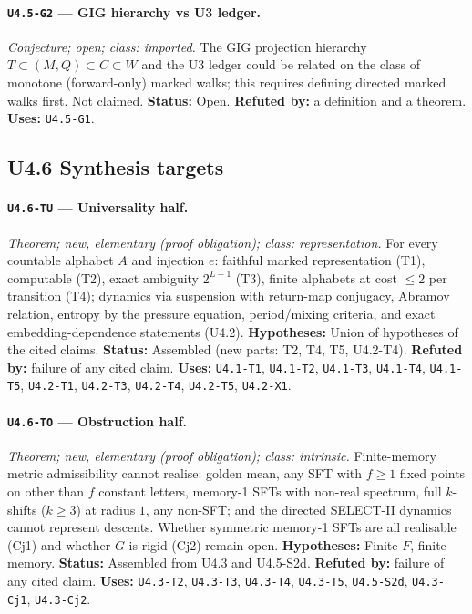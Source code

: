 \documentclass[11pt]{article}
\begin{document}
\paragraph{\texttt{U4.5-G2} --- GIG hierarchy vs U3 ledger.} \emph{Conjecture; open; class: imported.} The GIG projection hierarchy $T\subset(M,Q)\subset C\subset W$ and the U3 ledger could be related on the class of monotone (forward-only) marked walks; this requires defining directed marked walks first. Not claimed. \textbf{Status:} Open. \textbf{Refuted by:} a definition and a theorem. \textbf{Uses:} \texttt{U4.5-G1}.

\subsection{U4.6 Synthesis targets}
\paragraph{\texttt{U4.6-TU} --- Universality half.} \emph{Theorem; new, elementary (proof obligation); class: representation.} For every countable alphabet $A$ and injection $e$: faithful marked representation (T1), computable (T2), exact ambiguity $2^{L-1}$ (T3), finite alphabets at cost $\le2$ per transition (T4); dynamics via suspension with return-map conjugacy, Abramov relation, entropy by the pressure equation, period/mixing criteria, and exact embedding-dependence statements (U4.2). \textbf{Hypotheses:} Union of hypotheses of the cited claims. \textbf{Status:} Assembled (new parts: T2, T4, T5, U4.2-T4). \textbf{Refuted by:} failure of any cited claim. \textbf{Uses:} \texttt{U4.1-T1}, \texttt{U4.1-T2}, \texttt{U4.1-T3}, \texttt{U4.1-T4}, \texttt{U4.1-T5}, \texttt{U4.2-T1}, \texttt{U4.2-T3}, \texttt{U4.2-T4}, \texttt{U4.2-T5}, \texttt{U4.2-X1}.

\paragraph{\texttt{U4.6-TO} --- Obstruction half.} \emph{Theorem; new, elementary (proof obligation); class: intrinsic.} Finite-memory metric admissibility cannot realise: golden mean, any SFT with $f\ge1$ fixed points on other than $f$ constant letters, memory-1 SFTs with non-real spectrum, full $k$-shifts ($k\ge3$) at radius $1$, any non-SFT; and the directed SELECT-II dynamics cannot represent descents. Whether symmetric memory-1 SFTs are all realisable (Cj1) and whether $G$ is rigid (Cj2) remain open. \textbf{Hypotheses:} Finite $F$, finite memory. \textbf{Status:} Assembled from U4.3 and U4.5-S2d. \textbf{Refuted by:} failure of any cited claim. \textbf{Uses:} \texttt{U4.3-T2}, \texttt{U4.3-T3}, \texttt{U4.3-T4}, \texttt{U4.3-T5}, \texttt{U4.5-S2d}, \texttt{U4.3-Cj1}, \texttt{U4.3-Cj2}.
\end{document}
